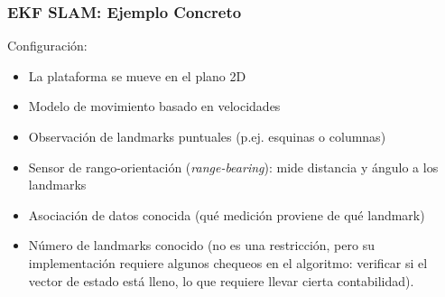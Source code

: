 \begin{frame}
    \frametitle{EKF SLAM: Ejemplo Concreto}

    Configuración:
    \begin{itemize}
        \item La plataforma se mueve en el plano 2D
        \item Modelo de movimiento basado en velocidades
        \item Observación de landmarks puntuales (p.ej. esquinas o columnas)
        \item Sensor de rango-orientación (\emph{range-bearing}): mide distancia y ángulo a los landmarks
        \item Asociación de datos conocida (qué medición proviene de qué landmark)
        \item Número de landmarks conocido (no es una restricción, pero su implementación requiere algunos chequeos en el algoritmo: verificar si el vector de estado está lleno, lo que requiere llevar cierta contabilidad). 
    \end{itemize}
\end{frame}

